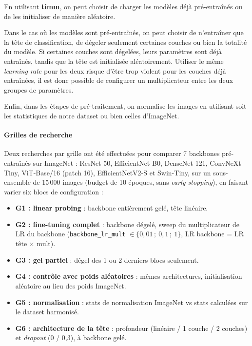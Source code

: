 En utilisant \textbf{timm}, on peut choisir de charger les modèles déjà pré-entraînés ou de les initialiser de manière aléatoire.

Dans le cas où les modèles sont pré-entraînés, on peut choisir de n'entraîner que la tête de classification, de dégeler seulement certaines couches ou bien la totalité du modèle.
Si certaines couches sont dégelées, leurs paramètres sont déjà entraînés, tandis que la tête est initialisée aléatoirement.
Utiliser le même \emph{learning rate} pour les deux risque d'être trop violent pour les couches déjà entraînées, il est donc possible de configurer un multiplicateur entre les deux groupes de paramètres.

Enfin, dans les étapes de pré-traitement, on normalise les images en utilisant soit les statistiques de notre dataset ou bien celles d'ImageNet.

\paragraph{Grilles de recherche}

Deux recherches par grille ont été effectuées pour comparer 7 backbones pré-entraînés sur ImageNet : ResNet-50, EfficientNet-B0, DenseNet-121, ConvNeXt-Tiny, ViT-Base/16 (patch 16), EfficientNetV2-S et Swin-Tiny, sur un sous-ensemble de 15\,000 images (budget de 10 époques, sans \emph{early stopping}), en faisant varier six blocs de configuration :

\begin{itemize}
\item \textbf{G1 : linear probing} : backbone entièrement gelé, tête linéaire.
\item \textbf{G2 : fine-tuning complet} : backbone dégelé, sweep du multiplicateur de LR du backbone (\texttt{backbone\_lr\_mult} $\in \{0{,}01\,;\ 0{,}1\,;\ 1\}$, LR backbone = LR tête $\times$ mult).
\item \textbf{G3 : gel partiel} : dégel des 1 ou 2 derniers blocs seulement.
\item \textbf{G4 : contrôle avec poids aléatoires} : mêmes architectures, initialisation aléatoire au lieu des poids ImageNet.
\item \textbf{G5 : normalisation} : stats de normalisation ImageNet vs stats calculées sur le dataset harmonisé.
\item \textbf{G6 : architecture de la tête} : profondeur (linéaire / 1 couche / 2 couches) et \emph{dropout} (0 / 0,3), à backbone gelé.
\end{itemize}

